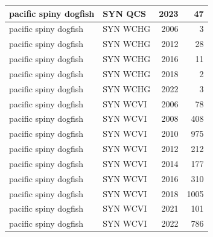 \documentclass[
  letterpaper,
  DIV=11,
  numbers=noendperiod]{scrartcl}
\begin{document}
\begin{tabular}[t]{l|l|r|r}
\hline
pacific spiny dogfish & SYN QCS & 2023 & 47\\
\hline
pacific spiny dogfish & SYN WCHG & 2006 & 3\\
\hline
pacific spiny dogfish & SYN WCHG & 2012 & 28\\
\hline
pacific spiny dogfish & SYN WCHG & 2016 & 11\\
\hline
pacific spiny dogfish & SYN WCHG & 2018 & 2\\
\hline
pacific spiny dogfish & SYN WCHG & 2022 & 3\\
\hline
pacific spiny dogfish & SYN WCVI & 2006 & 78\\
\hline
pacific spiny dogfish & SYN WCVI & 2008 & 408\\
\hline
pacific spiny dogfish & SYN WCVI & 2010 & 975\\
\hline
pacific spiny dogfish & SYN WCVI & 2012 & 212\\
\hline
pacific spiny dogfish & SYN WCVI & 2014 & 177\\
\hline
pacific spiny dogfish & SYN WCVI & 2016 & 310\\
\hline
pacific spiny dogfish & SYN WCVI & 2018 & 1005\\
\hline
pacific spiny dogfish & SYN WCVI & 2021 & 101\\
\hline
pacific spiny dogfish & SYN WCVI & 2022 & 786\\
\hline
\end{tabular}
\end{document}
